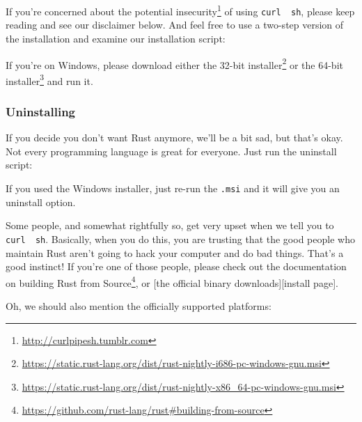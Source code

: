 \documentclass[a4paper,]{book}
\newenvironment{Shaded}{\begin{snugshade}}{\end{snugshade}}
\newcommand{\KeywordTok}[1]{\textcolor[rgb]{0.13,0.29,0.53}{\textbf{{#1}}}}
\newcommand{\NormalTok}[1]{{#1}}
\renewcommand{\href}[2]{#2\footnote{\url{#1}}}
\begin{document}
If you're concerned about the
\href{http://curlpipesh.tumblr.com}{potential insecurity} of using
\texttt{curl\ \textbar{}\ sh}, please keep reading and see our
disclaimer below. And feel free to use a two-step version of the
installation and examine our installation script:

\begin{Shaded}
\end{Shaded}

If you're on Windows, please download either the
\href{https://static.rust-lang.org/dist/rust-nightly-i686-pc-windows-gnu.msi}{32-bit
installer} or the
\href{https://static.rust-lang.org/dist/rust-nightly-x86_64-pc-windows-gnu.msi}{64-bit
installer} and run it.

\subsubsection{Uninstalling}\label{uninstalling-1}

If you decide you don't want Rust anymore, we'll be a bit sad, but
that's okay. Not every programming language is great for everyone. Just
run the uninstall script:

\begin{Shaded}
\end{Shaded}

If you used the Windows installer, just re-run the \texttt{.msi} and it
will give you an uninstall option.

Some people, and somewhat rightfully so, get very upset when we tell you
to \texttt{curl\ \textbar{}\ sh}. Basically, when you do this, you are
trusting that the good people who maintain Rust aren't going to hack
your computer and do bad things. That's a good instinct! If you're one
of those people, please check out the documentation on
\href{https://github.com/rust-lang/rust\#building-from-source}{building
Rust from Source}, or {[}the official binary downloads{]}{[}install
page{]}.

Oh, we should also mention the officially supported platforms:
\end{document}
